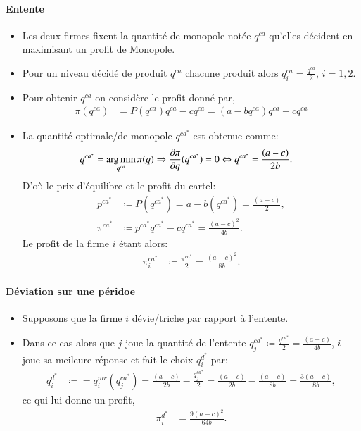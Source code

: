 \begin{frame}
[allowframebreaks]{\insertsection}
\framesubtitle{Entente\\}

    \begin{itemize}
        \item Les deux firmes fixent la quantité de monopole notée $q^{ca}$ qu'elles décident en maximisant un profit de Monopole.
        \item Pour un niveau décidé de produit $q^{ca}$ chacune produit alors $q_i^{ca} = \frac{q^{ca}}{2}$, $i=1, 2$.
        \item Pour obtenir  $q^{ca}$  on considère le profit donné par,
        \begin{align*}
            \pi(q^{ca}) &= P(q^{ca})q^{ca} - cq^{ca} = (a-bq^{ca})q^{ca} - cq^{ca}
        \end{align*}
        \item La quantité optimale/de monopole $q^{ca^*}$ est obtenue comme:
        \begin{align*}
            q^{ca^*} &=\argmin_{q^{ca}}  \pi(q) \Rightarrow \frac{\partial \pi}{\partial q}( q^{ca^*}) = 0 
            \Leftrightarrow  q^{ca^*} = \frac{(a-c)}{2b}.
        \end{align*}
        D'où le prix d'équilibre et le profit du cartel:
        \begin{align*}
        p^{ca^*} &\coloneqq P(q^{ca^*}) = a - b\left(q^{ca^*}\right) = \frac{(a-c)}{2},\\
        \pi ^{ca^*} &\coloneqq p^{ca^*}  q^{ca^*}  - c q^{ca^*}  =  \frac{(a-c)^2}{4b}.
        \end{align*}
        Le profit de la firme $i$ étant alors:
        \begin{align*}
        \pi_i ^{ca^*} &\coloneqq \frac{\pi ^{ca^*}}{2} = \frac{(a-c)^2}{8b}.
        \end{align*}
    \end{itemize}
    \end{frame}

\begin{frame}
[allowframebreaks]{\insertsection}
\framesubtitle{Déviation sur une péridoe\\}
\begin{itemize}
\item Supposons que la firme $i$ dévie/triche par rapport à l'entente.
\item Dans ce cas alors que $j$ joue la quantité de l'entente  $q_j^{ca^*} \coloneqq \frac{q^{ca^*}}{2} =  \frac{(a-c)}{4b}$, $i$ joue sa meileure réponse 
et fait le choix $q_i^{d^*}$ par:
\begin{align*}
q_i^{d^*} &\coloneqq = q_i^{mr}(q_j^{ca^*} ) = \frac{(a-c)}{2b} - \frac{q_j^{ca^*} }{2} = \frac{(a-c)}{2b} - \frac{(a-c)}{8b} = \frac{3(a-c)}{8b},
\end{align*}
ce qui lui donne un profit,
\begin{align*}
\pi_i^{d^*} &= \frac{9(a-c)^2}{64b}.
\end{align*}
\end{itemize}
    \end{frame}


